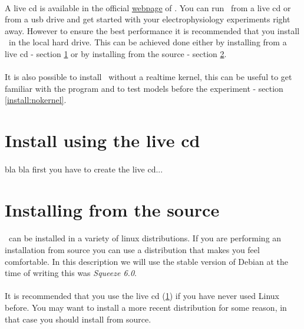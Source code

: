 \paragraph{}
A live cd is available in the official \href{http://www.tnb.ua.ac.be}{webpage} of \progname. You can run \progname\ from a live cd or from a usb drive and get started with your electrophysiology experiments right away. However to ensure the best performance it is recommended that you install \progname\ in the local hard drive. This can be achieved done either by installing from a live cd - section \ref{install:live_cd} or by installing from the source - section \ref{install:source}.
\paragraph{}
It is also possible to install \progname\ without a realtime kernel, this can be useful to get familiar with the program and to test models before the experiment - section \ref{install:nokernel}.

\section{Install using the live cd}
\label{install:live_cd}

\paragraph{}
bla bla first you have to create the live cd...

\section{Installing from the source}
\label{install:source}

\paragraph{}
\texttt{\progname}\ can be installed in a variety of linux distributions. If you are performing an installation from source you can use a distribution that makes you feel comfortable. In this description we will use the stable version of Debian at the time of writing this was \emph{Squeeze 6.0}.
\paragraph{}
 It is recommended that you use the live cd (\ref{install:live_cd}) if you have never used Linux before. You may want to install a more recent distribution for some reason, in that case you should install from source.
